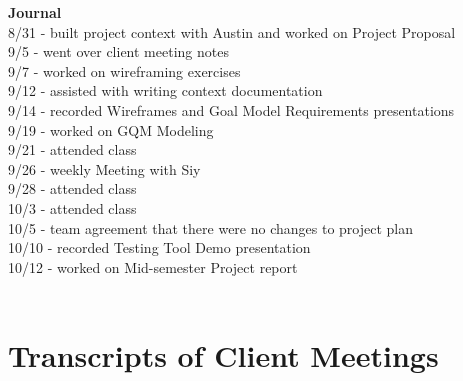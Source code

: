 \documentclass[oneside,openany,obeyspaces]{book}
\begin{document}
\begin{flushleft}
    \textbf{Journal\\}
    8/31 - built project context with Austin and worked on Project Proposal\\
    9/5 - went over client meeting notes\\
    9/7 - worked on wireframing exercises\\
    9/12 - assisted with writing context documentation\\
    9/14 - recorded Wireframes and Goal Model Requirements presentations\\
    9/19 - worked on GQM Modeling\\
    9/21 - attended class\\
    9/26 - weekly Meeting with Siy\\
    9/28 - attended class\\
    10/3 - attended class\\
    10/5 - team agreement that there were no changes to project plan\\
    10/10 -  recorded Testing Tool Demo presentation\\
    10/12 - worked on Mid-semester Project report\\~\\


    \section{Transcripts of Client Meetings}


    


    



\end{flushleft}
\end{document}
